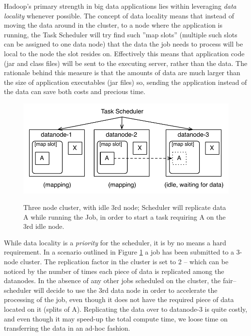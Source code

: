 Hadoop's primary strength in big data applications lies within leveraging \textit{data locality} whenever possible. The concept of data locality means that instead of moving the data around in the cluster, to a node where the application is running, the Task Scheduler will try find such ''map slots'' (multiple such slots can be assigned to one data node) that the data the job needs to process will be local to the node the slot resides on. Effectively this means that application code (jar and class files) will be sent to the executing server, rather than the data. The rationale behind this measure is that the amounts of data are much larger than the size of application executables (jar files) so, sending the application instead of the data can save both costs and precious time.


\begin{figure}[ch!]
  \centering
  \includegraphics[width=\textwidth]{img/forced-data-replication.pdf}
  \label{fig:replication-ad-hoc}
  \caption{Three node cluster, with idle 3rd node; Scheduler will replicate data A while running the Job, in order to start a task requiring A on the 3rd idle node.}
\end{figure}


While data locality is a \textit{priority} for the scheduler, it is by no means a hard requirement. In a scenario outlined in Figure \ref{fig:replication-ad-hoc} a job has been submitted to a 3-node cluster. The replication factor in the cluster is set to 2 -- which can be noticed by the number of times each piece of data is replicated among the datanodes. In the absence of any other jobs scheduled on the cluster, the fair--scheduler will decide to use the 3rd data node in order to accelerate the processing of the job, even though it does not have the required piece of data located on it (splits of A). Replicating the data over to datanode-3 is quite costly, and even though it may speed-up the total compute time, we loose time on transferring the data in an ad-hoc fashion.

